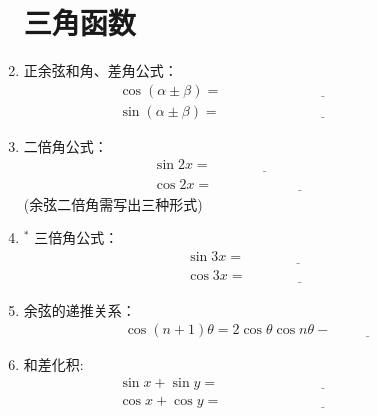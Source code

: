 \documentclass{article}
\newif\ifte
\begin{document}
\begin{multicols}{2}
\begin{enumerate}[leftmargin=20pt]
\section{三角函数}
\item 正余弦和角、差角公式：
\begin{align*} 
    \cos(\alpha\pm\beta )=&\ \underline{\ \ifte 
    \cos\alpha\cos\beta \mp \sin\alpha\sin\beta 
    \else \hspace{5cm} \fi\ } \\
    \sin(\alpha\pm\beta )=&\ \underline{\ \ifte 
    \sin\alpha\cos\beta \pm \cos\alpha\sin\beta    
        \else \hspace{5cm} \fi\ } 
\end{align*}

\item 二倍角公式：
\begin{align*}
    & \sin 2x=\underline{\ \ifte 2\sin x\cos x
        \else \hspace{3cm} \fi\ } \\    
    & \cos 2x=\underline{\ \ifte 2\cos^2 x-1=1-2
     \sin^2 x=\cos^2 x- \sin^2 x\else \hspace{5cm} \fi\ }
\end{align*}
\ifte \else (余弦二倍角需写出三种形式) \fi

\item $^*$ 三倍角公式：
\begin{align*} 
    & \sin 3x=\underline{\ \ifte -4 \sin^3 x+ 3\sin x
        \else \hspace{3cm} \fi\ } 	  \\	
    & \cos 3x=\underline{\ \ifte 4 \cos^3 x- 3\cos x
        \else \hspace{3cm} \fi\ } 
\end{align*}


\item 余弦的递推关系：
\begin{gather*}
    \cos(n+1)\theta=2\cos\theta\cos n\theta-\underline{\ 
        \ifte \cos(n-1)\theta \else \hspace{2cm} \fi\ } 
\end{gather*}

\item 和差化积:
\begin{align*}
    \sin x+\sin y=&\ \underline{\ \ifte 2\sin \left(\dfrac{x+y}{2}
    \right) \cos\left(\dfrac{x-y}{2}\right)\else \hspace{5cm} \fi\ } \\ 
    \cos x+\cos y=&\ \underline{\ \ifte 2\cos \left(\dfrac{x+y}{2}\right) \cos  \left(\dfrac{x-y}{2}\right) \else \hspace{5cm} \fi\ }
\end{align*}


\end{enumerate}
\end{multicols}
\end{document}
